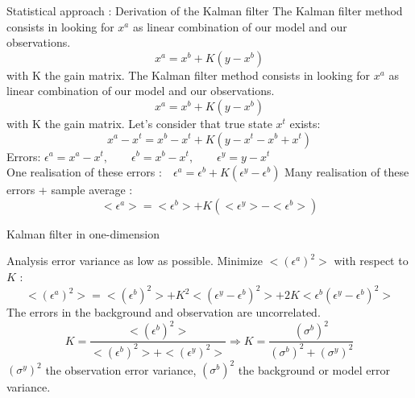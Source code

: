\begin{frame}[allowframebreaks]{Statistical approach : Derivation of the Kalman filter}
   The Kalman filter method consists in looking for $x^a$ as linear combination of our model and our observations.
   \begin{equation*}
       x^a=x^b+K(y-x^b)
       \label{eq1}
   \end{equation*}
   with K the gain matrix.
\newpage
    The Kalman filter method consists in looking for $x^a$ as linear combination of our model and our observations.
   \begin{equation}
       x^a=x^b+K(y-x^b)
       \label{eq1}
   \end{equation}
   with K the gain matrix.
   \newline Let’s consider that true state $x^t$ exists:
   \begin{equation}
       x^a-x^t=x^b-x^t+K(y-x^t-x^b+x^t)
   \end{equation}
   Errors: \qquad $\epsilon^a=x^a-x^t,\qquad \epsilon^b=x^b-x^t, \qquad \epsilon^y=y-x^t$ \\
   One realisation of these errors :$ \quad \epsilon^a=\epsilon^b+K(\epsilon^y-\epsilon^b)$
   Many realisation of these errors + sample average :
   \begin{equation}
       <\epsilon^a>=<\epsilon^b>+K(<\epsilon^y>-<\epsilon^b>)
   \end{equation}
\end{frame}
\begin{frame}{Kalman filter in one-dimension}

   Analysis error variance as low as possible.
   \newline Minimize $<(\epsilon^a)^2>$ with respect to $K$ :
   $$<(\epsilon^a)^2>=<(\epsilon^b)^2>+K^2<(\epsilon^y-\epsilon^b)^2>+2K<\epsilon^b(\epsilon^y-\epsilon^b)^2>$$
   The errors in the background and observation are uncorrelated.
   $$K=\frac{<(\epsilon^b)^2>}{<(\epsilon^b)^2>+<(\epsilon^y)^2>} \Rightarrow K=\frac{(\sigma^b)^2}{(\sigma^b)^2+(\sigma^y)^2} $$
   $(\sigma^y)^2$ the observation error variance, \newline $(\sigma^b)^2$ the background or model error variance.

\end{frame}
   
